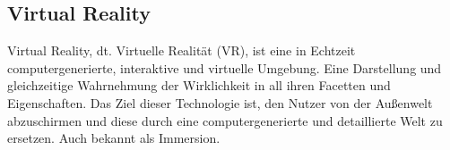\subsection*{Virtual Reality}
Virtual Reality, dt. Virtuelle Realität (\acs{VR}), ist eine in Echtzeit computergenerierte, interaktive und virtuelle Umgebung. Eine Darstellung 
und gleichzeitige Wahrnehmung der Wirklichkeit in all ihren Facetten und Eigenschaften. Das Ziel dieser Technologie ist, den Nutzer von der 
Außenwelt abzuschirmen und diese durch eine computergenerierte und detaillierte Welt zu ersetzen. \cite{vr.2018n} Auch bekannt als Immersion.
